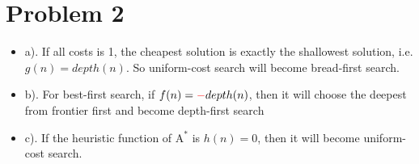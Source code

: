 \documentclass{mcmthesis}
\begin{document}
\section{Problem 2}
\begin{itemize}
	\item a). If all costs is 1, the cheapest solution is exactly the shallowest solution, i.e. $g(n)=depth(n)$. So uniform-cost search will become bread-first search.
	\item b). For best-first search, if $f(n)={\color{red}-}depth(n)$, then it will choose the deepest from frontier first and become depth-first search
	\item c). If the heuristic function of $\text{A}^*$  is $h(n)=0$, then it will become uniform-cost search. 
\end{itemize}
\end{document}
